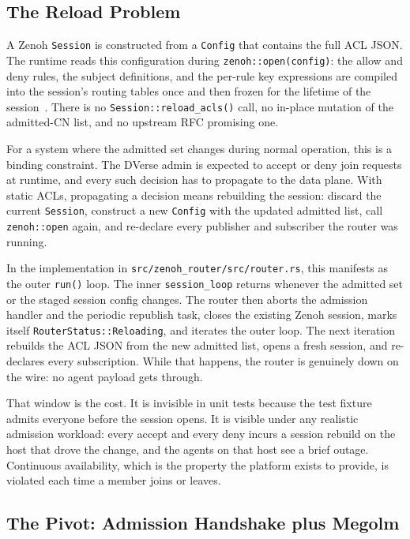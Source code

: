 \documentclass[11pt,a4paper]{article}
\begin{document}
\subsection{The Reload Problem}

A Zenoh \texttt{Session} is constructed from a \texttt{Config} that
contains the full ACL JSON. The runtime reads this configuration
during \texttt{zenoh::open(config)}: the allow and deny rules, the
subject definitions, and the per-rule key expressions are compiled
into the session's routing tables once and then frozen for the
lifetime of the session~\citep{zenoh-acl,zenoh-acl-rfc}. There is no
\texttt{Session::reload\_acls()} call, no in-place mutation of the
admitted-CN list, and no upstream RFC promising one.

For a system where the admitted set changes during normal operation,
this is a binding constraint. The DVerse admin is expected to accept
or deny join requests at runtime, and every such decision has to
propagate to the data plane. With static ACLs, propagating a decision
means rebuilding the session: discard the current
\texttt{Session}, construct a new \texttt{Config} with the updated
admitted list, call \texttt{zenoh::open} again, and re-declare every
publisher and subscriber the router was running.

In the implementation in
\texttt{src/zenoh\_router/src/router.rs}, this manifests as the outer
\texttt{run()} loop. The inner \texttt{session\_loop} returns whenever
the admitted set or the staged session config changes. The router
then aborts the admission handler and the periodic republish task,
closes the existing Zenoh session, marks itself
\texttt{RouterStatus::Reloading}, and iterates the outer loop. The
next iteration rebuilds the ACL JSON from the new admitted list,
opens a fresh session, and re-declares every subscription. While that
happens, the router is genuinely down on the wire: no agent payload
gets through.

That window is the cost. It is invisible in unit tests because the
test fixture admits everyone before the session opens. It is visible
under any realistic admission workload: every accept and every deny
incurs a session rebuild on the host that drove the change, and the
agents on that host see a brief outage. Continuous availability,
which is the property the platform exists to provide, is violated
each time a member joins or leaves.

\subsection{The Pivot: Admission Handshake plus Megolm}
\end{document}
